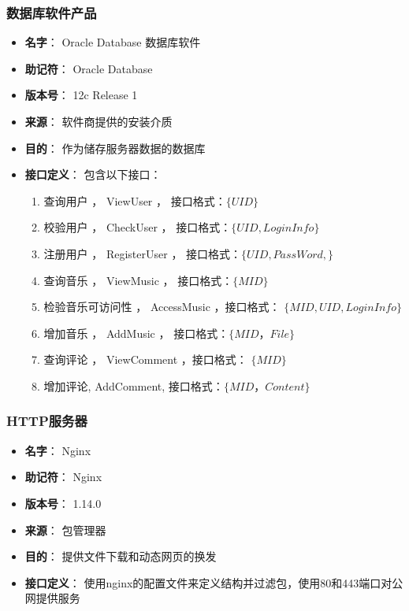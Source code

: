 \subsubsection{数据库软件产品} %
\begin{itemize}
	\item \textbf{名字}：
		Oracle Database 数据库软件
	\item \textbf{助记符}：
		Oracle Database
	\item \textbf{版本号}：
		12c Release 1
	\item \textbf{来源}：
		软件商提供的安装介质
	\item \textbf{目的}：
		作为储存服务器数据的数据库
	\item \textbf{接口定义}：
		包含以下接口：
		\begin{enumerate}
			\item 查询用户 ， ViewUser   ， 接口格式：$\{ UID \}$
			\item 校验用户 ， CheckUser  ， 接口格式：$\{ UID, LoginInfo \}$
			\item 注册用户 ， RegisterUser  ， 接口格式：$\{ UID,  PassWord,\}$
			\item 查询音乐 ， ViewMusic  ， 接口格式：$\{ MID \}$
			\item 检验音乐可访问性 ， AccessMusic ，接口格式： $\{ MID, UID, LoginInfo \}$
			\item 增加音乐 ， AddMusic  ， 接口格式：$\{ MID，File \}$
			\item 查询评论 ， ViewComment ，接口格式： $\{MID \}$
			\item 增加评论, AddComment, 接口格式：$\{MID，Content \}$
		\end{enumerate}
\end{itemize}


\subsubsection{HTTP服务器} %
\begin{itemize}
	\item \textbf{名字}：
	Nginx
	\item \textbf{助记符}：
	Nginx
	\item \textbf{版本号}：
	1.14.0
	\item \textbf{来源}：
	包管理器
	\item \textbf{目的}：
	提供文件下载和动态网页的换发
	\item \textbf{接口定义}：
	使用nginx的配置文件来定义结构并过滤包，使用80和443端口对公网提供服务
\end{itemize}

